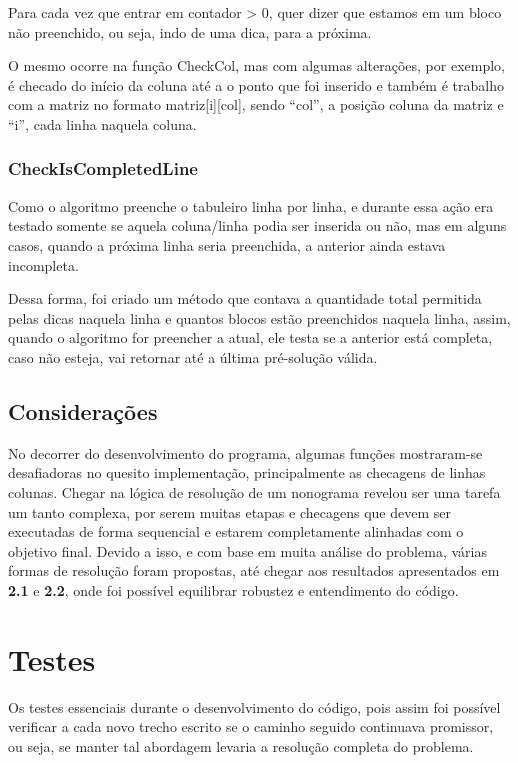 \documentclass{article}
\begin{document}
Para cada vez que entrar em contador > 0, quer dizer que estamos em um bloco não preenchido, ou seja, indo de uma dica, para a próxima.

O mesmo ocorre na função CheckCol, mas com algumas alterações, por exemplo, é checado do início da coluna até a o ponto que foi inserido e também é trabalho com a matriz no formato matriz[i][col], sendo “col”, a posição coluna da matriz e “i”, cada linha naquela coluna.


\subsubsection{CheckIsCompletedLine}

Como o algoritmo preenche o tabuleiro linha por linha, e durante essa ação era testado somente se aquela coluna/linha podia ser inserida ou não, mas em alguns casos, quando a próxima linha seria preenchida, a anterior ainda estava incompleta.

Dessa forma, foi criado um método que contava a quantidade total permitida pelas dicas naquela linha  e quantos blocos estão preenchidos naquela linha, assim, quando o algoritmo for preencher a atual, ele testa se a anterior está completa, caso não esteja, vai retornar até a última pré-solução válida.

\subsection{Considerações}
No decorrer do desenvolvimento do programa, algumas funções mostraram-se desafiadoras no quesito implementação, principalmente as checagens de linhas  colunas.
Chegar na lógica de resolução de um nonograma revelou ser uma tarefa um tanto complexa, por serem muitas etapas e checagens que devem ser executadas de forma sequencial e estarem completamente alinhadas com o objetivo final. Devido a isso, e com base em muita análise do problema, várias formas de resolução foram propostas, até chegar aos resultados apresentados em \textbf{2.1} e \textbf{2.2}, onde foi possível equilibrar robustez e entendimento do código.

\section{Testes}

Os testes essenciais durante o desenvolvimento do código, pois assim foi possível verificar a cada novo trecho escrito se o caminho seguido continuava promissor, ou seja, se manter tal abordagem levaria a resolução completa do problema. 
\end{document}
